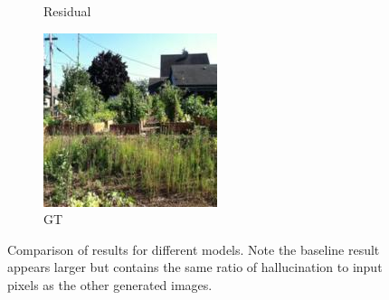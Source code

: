 \documentclass{article}
\begin{document}
\begin{figure}
\begin{subfigure}[b]{0.175\textwidth}
        \caption{Residual}
    \end{subfigure}
    \hfill
    \begin{subfigure}[b]{0.175\textwidth}
        \includegraphics[width=\textwidth]{figs/fig2/ground_truth}
        \caption{GT}
    \end{subfigure}
  	\caption{Comparison of results for different models. Note the baseline result appears larger but contains the same ratio of hallucination to input pixels as the other generated images.}
  	\label{fig:fig2}
\end{figure}
\end{document}
